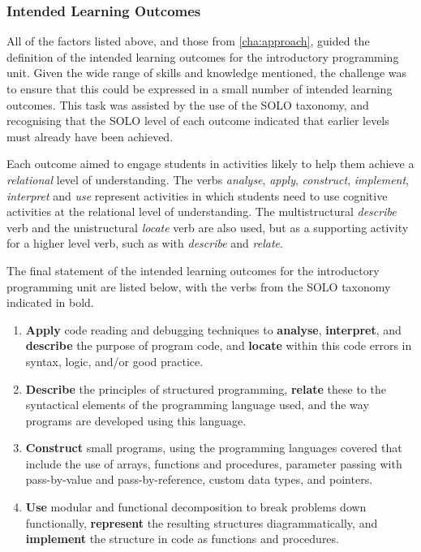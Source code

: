 

\subsubsection{Intended Learning Outcomes} %
\label{ssub:intro_intended_learning_outcomes}

All of the factors listed above, and those from \cref{cha:approach}, guided the definition of the intended learning outcomes for the introductory programming unit. Given the wide range of skills and knowledge mentioned, the challenge was to ensure that this could be expressed in a small number of intended learning outcomes. This task was assisted by the use of the SOLO taxonomy, and recognising that the SOLO level of each outcome indicated that earlier levels must already have been achieved.

Each outcome aimed to engage students in activities likely to help them achieve a \emph{relational} level of understanding. The verbs \emph{analyse}, \emph{apply}, \emph{construct}, \emph{implement}, \emph{interpret} and \emph{use} represent activities in which students need to use cognitive activities at the relational level of understanding. The multistructural \emph{describe} verb and the unistructural \emph{locate} verb are also used, but as a supporting activity for a higher level verb, such as with \emph{describe} and \emph{relate}.

The final statement of the intended learning outcomes for the introductory programming unit are listed below, with the verbs from the SOLO taxonomy indicated in bold.
\begin{enumerate}
	\item \textbf{Apply} code reading and debugging techniques to \textbf{analyse}, \textbf{interpret}, and \textbf{describe} the purpose of program code, and \textbf{locate} within this code errors in syntax, logic, and/or good practice.
	\item \textbf{Describe} the principles of structured programming, \textbf{relate} these to the syntactical elements of the programming language used, and the way programs are developed using this language.
	\item \textbf{Construct} small programs, using the programming languages covered that include the use of arrays, functions and procedures, parameter passing with pass-by-value and pass-by-reference, custom data types, and pointers.
	\item \textbf{Use} modular and functional decomposition to break problems down functionally, \textbf{represent} the resulting structures diagrammatically, and \textbf{implement} the structure in code as functions and procedures.
\end{enumerate}

